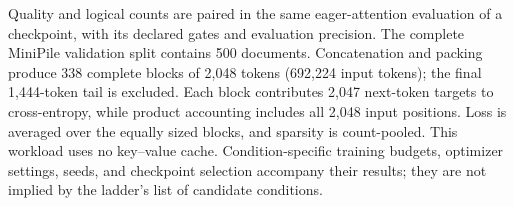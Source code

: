 Quality and logical counts are paired in the same eager-attention evaluation
of a checkpoint, with its declared gates and evaluation precision. The complete
MiniPile validation split contains 500 documents. Concatenation and packing
produce 338 complete blocks of 2,048 tokens (692,224 input tokens); the final
1,444-token tail is excluded. Each block contributes 2,047 next-token targets
to cross-entropy, while product accounting includes all 2,048 input positions.
Loss is averaged over the equally sized blocks, and sparsity is count-pooled.
This workload uses no key--value cache. Condition-specific training budgets,
optimizer settings, seeds, and checkpoint selection accompany their results;
they are not implied by the ladder's list of candidate conditions.
